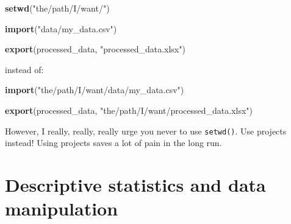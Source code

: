 \documentclass[]{gitbook}
\newenvironment{Shaded}{\begin{snugshade}}{\end{snugshade}}
\newcommand{\KeywordTok}[1]{\textcolor[rgb]{0.13,0.29,0.53}{\textbf{#1}}}
\newcommand{\NormalTok}[1]{#1}
\newcommand{\StringTok}[1]{\textcolor[rgb]{0.31,0.60,0.02}{#1}}
\theoremstyle{definition}
\theoremstyle{definition}
\theoremstyle{definition}
\theoremstyle{remark}
\begin{document}
\begin{Shaded}
\begin{Highlighting}[]
\KeywordTok{setwd}\NormalTok{(}\StringTok{"the/path/I/want/"}\NormalTok{)}

\KeywordTok{import}\NormalTok{(}\StringTok{"data/my_data.csv"}\NormalTok{)}

\KeywordTok{export}\NormalTok{(processed_data, }\StringTok{"processed_data.xlsx"}\NormalTok{)}
\end{Highlighting}
\end{Shaded}

instead of:

\begin{Shaded}
\begin{Highlighting}[]
\KeywordTok{import}\NormalTok{(}\StringTok{"the/path/I/want/data/my_data.csv"}\NormalTok{)}

\KeywordTok{export}\NormalTok{(processed_data, }\StringTok{"the/path/I/want/processed_data.xlsx"}\NormalTok{)}
\end{Highlighting}
\end{Shaded}

However, I really, really, really urge you never to use
\texttt{setwd()}. Use projects instead! Using projects saves a lot of
pain in the long run.

\hypertarget{descriptive-statistics-and-data-manipulation}{%
\section{Descriptive statistics and data
manipulation}\label{descriptive-statistics-and-data-manipulation}}
\end{document}
